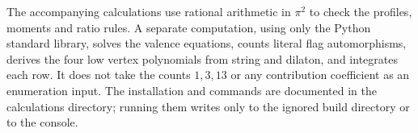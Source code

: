 \begin{rmk}[Reproducibility]
The accompanying calculations use rational arithmetic in $\pi^2$
to check the profiles, moments and ratio rules. A separate computation,
using only the Python standard library, solves
the valence equations, counts literal flag automorphisms, derives the
four low vertex polynomials from string and dilaton, and integrates
each row. It does not take the counts $1,3,13$ or any contribution
coefficient as an enumeration input. The installation and commands
are documented in the calculations directory; running them writes
only to the ignored build directory or to the console.
\end{rmk}

